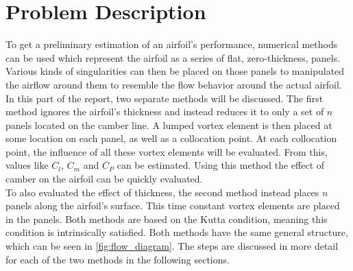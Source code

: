 \newcommand{\numfoil}{$\boldsymbol{\Gamma}$\textbf{py}\ }
\chapter{Problem Description}
To get a preliminary estimation of an airfoil's performance, numerical methods
can be used which represent the airfoil as a series of flat, zero-thickness,
panels. Various kinds of singularities can then be placed on those panels to
manipulated the airflow around them to resemble the flow behavior around the
actual airfoil.\\

In this part of the report, two separate methods will be discussed.
The first method ignores the airfoil's thickness and instead reduces it to only
a set of $n$ panels located on the camber line. A lumped vortex element is then
placed at some location on each panel, as well as a collocation point. At each
collocation point, the influence of all these vortex elements will be evaluated.
From this, values like $C_l$, $C_m$ and $C_P$ can be estimated. Using this
method the effect of camber on the airfoil can be quickly evaluated.\\

To also evaluated the effect of thickness, the second method instead places $n$
panels along the airfoil's surface. This time constant vortex elements are
placed in the panels.
Both methods are based on the Kutta condition, meaning this condition is
intrinsically satisfied. Both methods have the same general structure, which can
be seen in \autoref{fig:flow_diagram}. The steps are discussed in more detail
for each of the two methods in the following sections.


